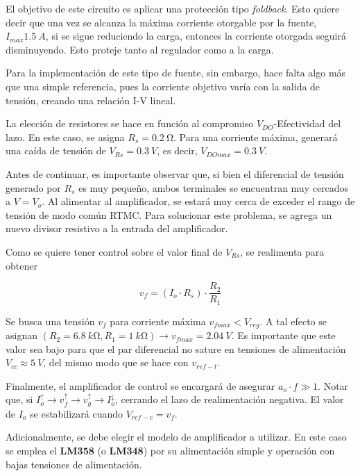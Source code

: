 \documentclass[]{article}
\begin{document}
El objetivo de este circuito es aplicar una protección tipo \textit{foldback}. Esto quiere decir que una vez se alcanza la máxima corriente otorgable por la fuente, $I_{max} \SI{1.5}{A}$, si se sigue reduciendo la carga, entonces la corriente otorgada seguirá disminuyendo. Esto proteje tanto al regulador como a la carga.

Para la implementación de este tipo de fuente, sin embargo, hace falta algo más que una simple referencia, pues la corriente objetivo varía con la salida de tensión, creando una relación I-V lineal.

La elección de resistores se hace en función al compromiso $V_{DO}$-Efectividad del lazo. En este caso, se asigna $R_{s} = \SI{0.2}{\ohm}$. Para una corriente máxima, generará una caída de tensión de $V_{Rs} = \SI{0.3}{V}$, es decir, $V_{DOmax}=\SI{0.3}{V}$.

Antes de continuar, es importante observar que, si bien el diferencial de tensión generado por $R_s$ es muy pequeño, ambos terminales se encuentran muy cercados a $V=V_{o}$. Al alimentar al amplificador, se estará muy cerca de exceder el rango de tensión de modo común RTMC.
Para solucionar este problema, se agrega un nuevo divisor resistivo a la entrada del amplificador. 

Como se quiere tener control sobre el valor final de $V_{Rs}$, se realimenta para obtener 

\begin{equation}
	v_f = (I_o \cdot R_s) \cdot \frac{R_2}{R_1}
\end{equation}

Se busca una tensión $v_f$ para corriente máxima $v_{fmax} < V_{reg}$. A tal efecto se asignan $(R_2 = \SI{6.8}{k\ohm},R_1 = \SI{1}{k\ohm}) \rightarrow v_{fmax} = \SI{2.04}{V}$. Es importante que este valor sea bajo para que el par diferencial no sature en tensiones de alimentación $V_{cc} \approx \SI{5}{V}$, del mismo modo que se hace con $v_{ref-t}$.

Finalmente, el amplificador de control se encargará de asegurar $a_o\cdot f \gg 1$. Notar que, si $I_o ^\uparrow \rightarrow v_{f} ^\uparrow \rightarrow v_g ^\uparrow \rightarrow I_o ^\downarrow$, cerrando el lazo de realimentación negativa. El valor de $I_o$ se estabilizará cuando $V_{ref-c} = v_f$.

Adicionalmente, se debe elegir el modelo de amplificador a utilizar. En este caso se emplea el \textbf{LM358} (o \textbf{LM348}) por su alimentación simple y operación con bajas tensiones de alimentación.
\end{document}
